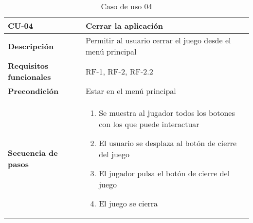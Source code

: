 \begin{longtable}{l|l}
\caption{Caso de uso 04}\\
\begin{minipage}{0.25\columnwidth}
\textbf{CU-04} 
\end{minipage}
&
\begin{minipage}{0.65\columnwidth}
Cerrar la aplicación
\end{minipage}
\\ \hline

\begin{minipage}{0.25\columnwidth}
\textbf{Descripción} 
\end{minipage}
&
\begin{minipage}{0.65\columnwidth}
Permitir al usuario cerrar el juego desde el menú principal
\end{minipage}
\\ \hline

\begin{minipage}{0.25\columnwidth}
\textbf{Requisitos funcionales} 
\end{minipage}
&
\begin{minipage}{0.65\columnwidth}
RF-1, RF-2, RF-2.2
\end{minipage}
\\ \hline

\begin{minipage}{0.25\columnwidth}
\textbf{Precondición} 
\end{minipage}
&
\begin{minipage}{0.65\columnwidth}
Estar en el menú principal
\end{minipage}
\\ \hline

\begin{minipage}{0.25\columnwidth}
\textbf{Secuencia de pasos} 
\end{minipage}
&
\begin{minipage}{0.65\columnwidth}
\begin{enumerate}
\item
Se muestra al jugador todos los botones con los que puede interactuar
\item
El usuario se desplaza al botón de cierre del juego
\item
El jugador pulsa el botón de cierre del juego
\item
El juego se cierra
\end{enumerate}
\end{minipage}
\\ \hline


\end{longtable}
